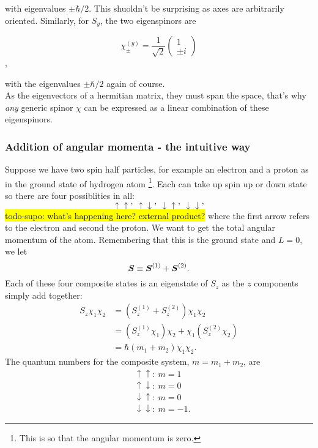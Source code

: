 with eigenvalues $\pm\hbar/2$. This shuoldn't be surprising as axes 
are arbitrarily oriented. Similarly, for $S_y$, the two eigenspinors are
\begin{singlespace}
\begin{equation}
\chi_{\pm}^{(y)}=\frac{1}{\sqrt{2}}
\begin{pmatrix}
1\\\pm i
\end{pmatrix}
\end{equation}, 
\end{singlespace}
with the eigenvalues $\pm\hbar/2$ again of course. \\
As the eigenvectors of a hermitian matrix, they must span the space, that's why 
\textit{any} generic spinor $\chi$ can be expressed as a linear combination of 
these eigenspinors. 
\subsubsection{Addition of angular momenta - the intuitive way}
\label{add_moment}
Suppose we have two spin half particles, for example an electron and a proton as 
in the ground state of hydrogen atom
\footnote{This is so that the angular momentum is zero.}. Each can take up 
spin up or down state so there are four possiblities in all:
\begin{equation}
\uparrow\uparrow,\ \uparrow\downarrow,\ \downarrow\uparrow,\ \downarrow\downarrow, 
\end{equation}
\hl{todo-supo: what's happening here? external product?}
where the first arrow refers to the electron and second the proton. We want to 
get the total angular momentum of the atom. Remembering that this is the ground 
state and $L=0$, we let
\begin{equation}
\boldsymbol{S}\equiv\boldsymbol{S}^{(1)}+\boldsymbol{S}^{(2)}.
\end{equation}
Each of these four composite states is an eigenstate of $S_z$ as the $z$ 
components simply add together:
\begin{equation}
\begin{aligned}
S_z\chi_1\chi_2&=(S_z^{(1)}+S_z^{(2)})\chi_1\chi_2\\
&=(S_z^{(1)}\chi_1)\chi_2+\chi_1(S_z^{(2)}\chi_2)\\
&=\hbar(m_1+m_2)\chi_1\chi_2.
\end{aligned}
\end{equation}
The quantum numbers for the composite system, $m=m_1+m_2$, are
\begin{equation}
\begin{aligned}
&\uparrow\uparrow:\ m=1\\ 
&\uparrow\downarrow:\ m=0\\ 
&\downarrow\uparrow:\ m=0\\ 
&\downarrow\downarrow:\ m=-1.
\end{aligned}
\end{equation}
